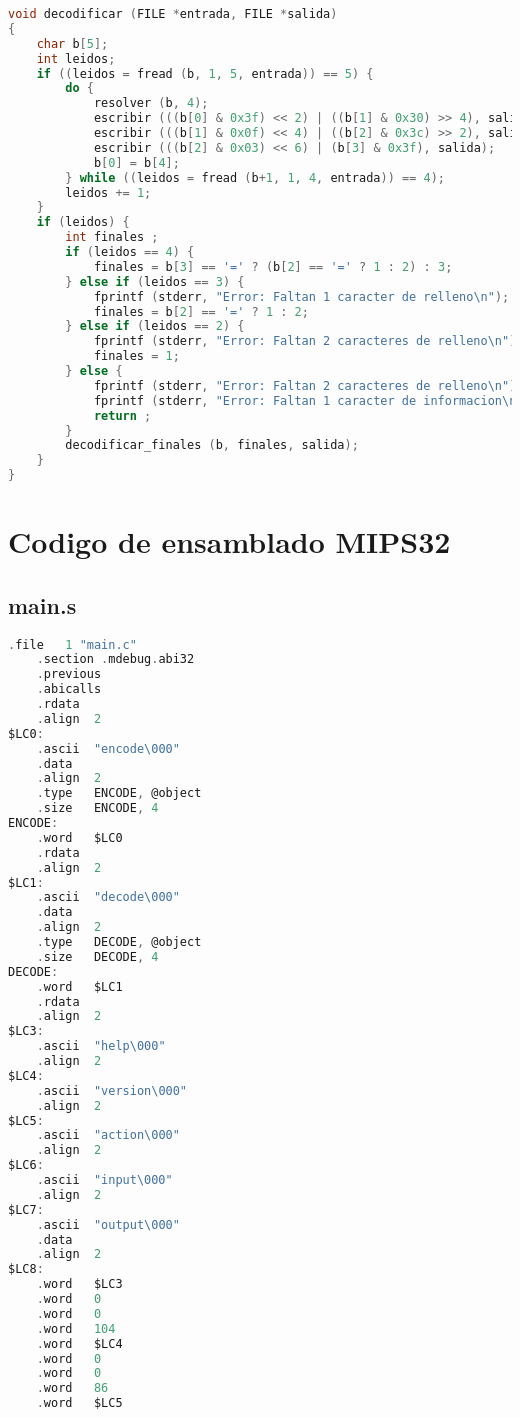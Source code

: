 \documentclass[a4paper,11pt, margin=1in]{article}
\begin{document}
\begin{lstlisting}[language=C,breaklines=true]
void decodificar (FILE *entrada, FILE *salida)
{
	char b[5];
	int leidos;
	if ((leidos = fread (b, 1, 5, entrada)) == 5) {
		do {
			resolver (b, 4);
			escribir (((b[0] & 0x3f) << 2) | ((b[1] & 0x30) >> 4), salida);
			escribir (((b[1] & 0x0f) << 4) | ((b[2] & 0x3c) >> 2), salida);
			escribir (((b[2] & 0x03) << 6) | (b[3] & 0x3f), salida);
			b[0] = b[4];
		} while ((leidos = fread (b+1, 1, 4, entrada)) == 4);
		leidos += 1;
	}
	if (leidos) {
		int finales ;
		if (leidos == 4) {
			finales = b[3] == '=' ? (b[2] == '=' ? 1 : 2) : 3;
		} else if (leidos == 3) {
			fprintf (stderr, "Error: Faltan 1 caracter de relleno\n");
			finales = b[2] == '=' ? 1 : 2;
		} else if (leidos == 2) {
			fprintf (stderr, "Error: Faltan 2 caracteres de relleno\n");
			finales = 1;
		} else {
			fprintf (stderr, "Error: Faltan 2 caracteres de relleno\n");
			fprintf (stderr, "Error: Faltan 1 caracter de informacion\n");
			return ;
		}
		decodificar_finales (b, finales, salida);
	}
}
\end{lstlisting}


\section{Codigo de ensamblado MIPS32}
\subsection{main.s}
\begin{lstlisting}[language=c,breaklines=true]
	.file	1 "main.c"
	.section .mdebug.abi32
	.previous
	.abicalls
	.rdata
	.align	2
$LC0:
	.ascii	"encode\000"
	.data
	.align	2
	.type	ENCODE, @object
	.size	ENCODE, 4
ENCODE:
	.word	$LC0
	.rdata
	.align	2
$LC1:
	.ascii	"decode\000"
	.data
	.align	2
	.type	DECODE, @object
	.size	DECODE, 4
DECODE:
	.word	$LC1
	.rdata
	.align	2
$LC3:
	.ascii	"help\000"
	.align	2
$LC4:
	.ascii	"version\000"
	.align	2
$LC5:
	.ascii	"action\000"
	.align	2
$LC6:
	.ascii	"input\000"
	.align	2
$LC7:
	.ascii	"output\000"
	.data
	.align	2
$LC8:
	.word	$LC3
	.word	0
	.word	0
	.word	104
	.word	$LC4
	.word	0
	.word	0
	.word	86
	.word	$LC5
\end{lstlisting}
\end{document}
